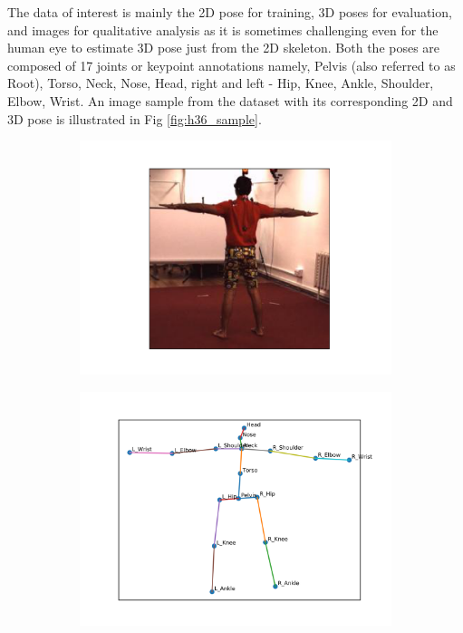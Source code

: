 The data of interest is mainly the 2D pose for training, 3D poses for evaluation, and images for qualitative analysis as it is sometimes challenging even for the human eye to estimate 3D pose just from the 2D skeleton. Both the poses are composed of 17 joints or keypoint annotations namely, Pelvis (also referred to as Root), Torso, Neck, Nose, Head, right and left - Hip, Knee, Ankle, Shoulder, Elbow, Wrist. An image sample from the dataset with its corresponding 2D and 3D pose is illustrated in Fig \ref{fig:h36_sample}. 

\begin{figure}
    \centering
    \begin{subfigure}[b]{0.3\textwidth}
        \centering
        \includegraphics[width=\textwidth]{figures/h36_viz/h36image.png}
        \caption{}
    \end{subfigure}
    \hfill
    \begin{subfigure}[b]{0.3\textwidth}
        \centering
        \includegraphics[width=\textwidth]{figures/h36_viz/h362d.png}

\end{subfigure}
\end{figure}
